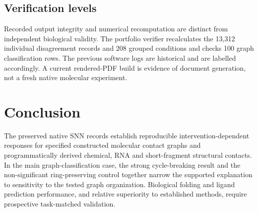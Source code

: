 \documentclass[10pt,a4paper]{article}
\begin{document}
\subsection{Verification levels}
Recorded output integrity and numerical recomputation are distinct from independent biological validity. The portfolio verifier recalculates the 13,312 individual disagreement records and 208 grouped conditions and checks 100 graph classification rows. The previous software logs are historical and are labelled accordingly. A current rendered-PDF build is evidence of document generation, not a fresh native molecular experiment.

\section{Conclusion}
The preserved native SNN records establish reproducible intervention-dependent responses for specified constructed molecular contact graphs and programmatically derived chemical, RNA and short-fragment structural contacts. In the main graph-classification case, the strong cycle-breaking result and the non-significant ring-preserving control together narrow the supported explanation to sensitivity to the tested graph organization. Biological folding and ligand prediction performance, and relative superiority to established methods, require prospective task-matched validation.
\end{document}
